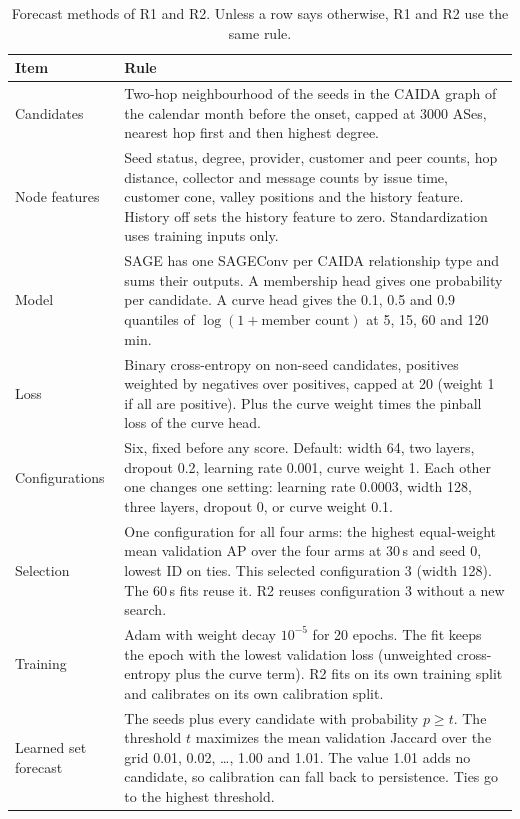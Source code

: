 \begin{table}[t]
\footnotesize
\centering
\caption{Forecast methods of R1 and R2. Unless a row says otherwise, R1 and R2 use the same rule.}
\label{tab:recipe}
\setlength{\tabcolsep}{3pt}
\begin{tabular}{@{}>{\raggedright\arraybackslash}p{}>{\raggedright\arraybackslash}p{}@{}}
\toprule
Item & Rule \\
\midrule
Candidates & Two-hop neighbourhood of the seeds in the CAIDA graph of the calendar month before the onset, capped at \num{3000} ASes, nearest hop first and then highest degree. \\
Node features & Seed status, degree, provider, customer and peer counts, hop distance, collector and message counts by issue time, customer cone, valley positions and the history feature. History off sets the history feature to zero. Standardization uses training inputs only. \\
Model & SAGE has one SAGEConv per CAIDA relationship type and sums their outputs. A membership head gives one probability per candidate. A curve head gives the 0.1, 0.5 and 0.9 quantiles of $\log(1+\text{member count})$ at 5, 15, 60 and 120\,min. \\
Loss & Binary cross-entropy on non-seed candidates, positives weighted by negatives over positives, capped at 20 (weight 1 if all are positive). Plus the curve weight times the pinball loss of the curve head. \\
Configurations & Six, fixed before any score. Default: width 64, two layers, dropout 0.2, learning rate 0.001, curve weight 1. Each other one changes one setting: learning rate 0.0003, width 128, three layers, dropout 0, or curve weight 0.1. \\
Selection & One configuration for all four arms: the highest equal-weight mean validation AP over the four arms at 30\,s and seed 0, lowest ID on ties. This selected configuration 3 (width 128). The 60\,s fits reuse it. R2 reuses configuration 3 without a new search. \\
Training & Adam with weight decay $10^{-5}$ for 20 epochs. The fit keeps the epoch with the lowest validation loss (unweighted cross-entropy plus the curve term). R2 fits on its own training split and calibrates on its own calibration split. \\
Learned set forecast & The seeds plus every candidate with probability $p \geq t$. The threshold $t$ maximizes the mean validation Jaccard over the grid 0.01, 0.02, \ldots, 1.00 and 1.01. The value 1.01 adds no candidate, so calibration can fall back to persistence. Ties go to the highest threshold. \\

\end{tabular}
\end{table}
